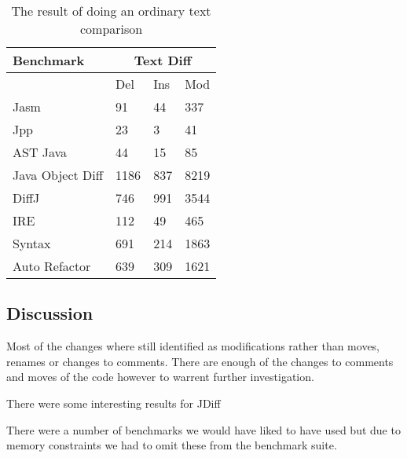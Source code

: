 \begin{table}[H]
    \centering
    \begin{tabular}{l|lll}
    Benchmark        & \multicolumn{3}{|c}{Text Diff} \\ \hline
    ~                & Del            & Ins & Mod  \\ \hline
    Jasm             & 91             & 44  & 337  \\
    Jpp              & 23             & 3   & 41   \\
    AST Java         & 44             & 15  & 85   \\
    Java Object Diff & 1186           & 837 & 8219 \\
    DiffJ            & 746            & 991 & 3544 \\
    IRE              & 112            & 49  & 465  \\
    Syntax           & 691            & 214 & 1863 \\
    Auto Refactor    & 639            & 309 & 1621 \\
    \end{tabular}
    \caption{The result of doing an ordinary text comparison}
    \label{tab:textcomp}
\end{table}



\subsection{Discussion}
% 

Most of the changes where still identified as modifications rather than moves, renames or changes to comments. 
There are enough of the changes to comments and moves of the code however to warrent further investigation.

There were some interesting results for JDiff


There were a number of benchmarks we would have liked to have used but due to memory constraints we had to omit these from the benchmark suite.



